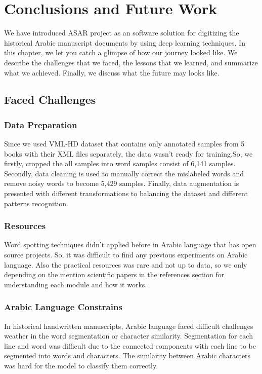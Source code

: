 \chapter{Conclusions and Future Work}



We have introduced ASAR project as an software solution for digitizing the historical Arabic manuscript documents by using deep learning techniques. In this chapter, we let you catch a glimpse of how our journey looked like. We describe the challenges that we faced, the lessons that we learned, and summarize what we achieved. Finally, we discuss what the future may looks like.

\section{Faced Challenges}
\subsection{Data Preparation}
Since we used VML-HD dataset that contains only annotated samples from 5 books with their XML files separately, the data wasn't ready for training.So, we firstly, cropped the all samples into word samples consist of 6,141 samples. Secondly, data cleaning is used to manually correct the mislabeled words and remove noisy words to become 5,429 samples. Finally, data augmentation is presented with different transformations to balancing the dataset and different patterns recognition.

\subsection{Resources}
Word spotting techniques didn't applied before in Arabic language that has open source projects. So, it was difficult to find any previous experiments on Arabic language. Also the practical resources was rare and not up to data, so we only depending on the mention scientific papers in the references section for understanding each module and how it works.

\subsection{Arabic Language Constrains}
In historical handwritten manuscripts, Arabic language faced difficult challenges weather in the word segmentation or character similarity. Segmentation for each line and word was difficult due to the connected components with each line to be segmented into words and characters. The similarity between Arabic characters was hard for the model to classify them correctly.

